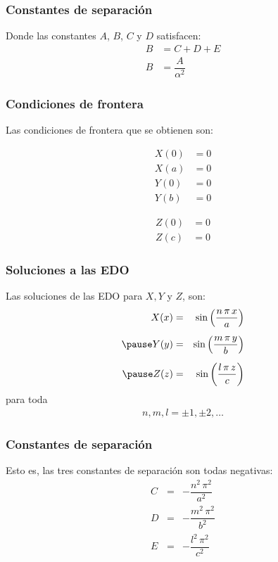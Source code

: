\begin{frame}
\frametitle{Constantes de separación}
Donde las constantes $A$, $B$, $C$ y $D$ satisfacen:
\begin{align*}
B &= C + D + E \\[0.5em]
B &= \dfrac{A}{\alpha^{2}}
\end{align*}
\end{frame}
\begin{frame}
\frametitle{Condiciones de frontera}
Las condiciones de frontera que se obtienen son:
\\
\begin{minipage}[t]{0.4\textwidth}
\begin{align}
X(0) &= 0 \label{eq:ecuacion_02_228} \\
X(a) &= 0 \label{eq:ecuacion_02_229} \\
Y(0) &= 0 \label{eq:ecuacion_02_230} \\
Y(b) &= 0 \label{eq:ecuacion_02_231}
\end{align}
\end{minipage}
\hspace{1cm}
\begin{minipage}[t]{0.4\textwidth}
\begin{align}
Z(0) &= 0 \label{eq:ecuacion_02_232} \\
Z(c) &= 0 \label{eq:ecuacion_02_233}
\end{align}
\end{minipage}
\end{frame}
\begin{frame}
\frametitle{Soluciones a las EDO}
Las soluciones de las EDO para $X, Y$ y $Z$, son:
\begin{eqnarray}
X(x) &=& \sin \left( \dfrac{n \, \pi \, x}{a} \right) \label{eq:ecuacion_02_234} \\[0.5em] \pause
Y(y) &=& \sin \left( \dfrac{m \, \pi \, y}{b} \right) \label{eq:ecuacion_02_235} \\[0.5em] \pause
Z(z) &=& \sin \left( \dfrac{l \, \pi \, z}{c} \right) \label{eq:ecuacion_02_236}
\end{eqnarray}
para toda
\begin{align*}
n, m, l = \pm 1, \pm 2, \ldots
\end{align*}
\end{frame}
\begin{frame}
\frametitle{Constantes de separación}
Esto es, las tres constantes de separación son todas negativas:
\begin{eqnarray*}
C &=& - \dfrac{n^{2} \, \pi^{2}}{a^{2}} \\[0.5em]
D &=& - \dfrac{m^{2} \, \pi^{2}}{b^{2}} \\[0.5em]
E &=& - \dfrac{l^{2} \, \pi^{2}}{c^{2}}
\end{eqnarray*}
\end{frame}
